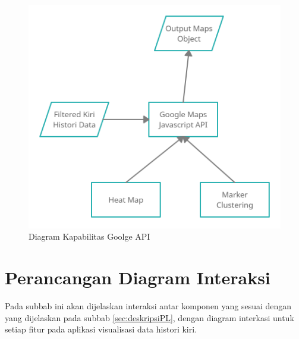 \begin{figure}[H]
	\centering  
	\includegraphics[scale=0.25]{Gambar/Kiri_GoogleAPI_Capabilty.png}  
	\caption[Rancangan Diagram Kapabilitas]{Diagram Kapabilitas Goolge API} 
	\label{fig:googleCapabilityDiagram} 
\end{figure}

\section{Perancangan Diagram Interaksi}
Pada subbab ini akan dijelaskan interaksi antar komponen yang  sesuai dengan yang dijelaskan pada subbab \ref{sec:deskripsiPL}, dengan diagram interkasi untuk setiap fitur pada aplikasi visualisasi data histori kiri.


